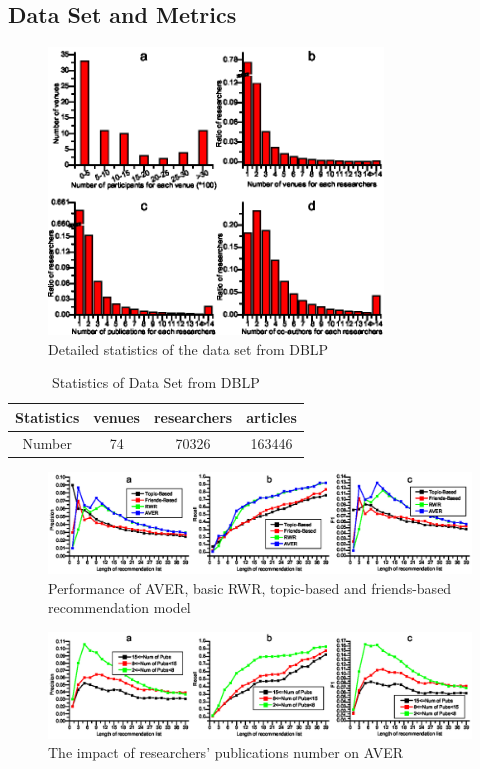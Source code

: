 \documentclass[9pt]{acm_proc_article-sp}
\begin{document}
\subsection{Data Set and Metrics}
\begin{figure}[t]
\centering
\includegraphics [width=3.5in]{Fig3.eps}
\caption{Detailed statistics of the data set from DBLP}
\label{fig3}
\end{figure}
\begin{table}
\renewcommand{\arraystretch}{1.2}
\centering
\caption{Statistics of Data Set from DBLP}
\label{table1}
\begin{tabular}{|c|c|c|c|} \hline
Statistics &venues&researchers&articles\\ \hline
Number & 74 & 70326 &163446 \\
\hline\end{tabular}
\end{table}
\begin{figure}[hbt]
\centering
\includegraphics [width=\textwidth]{Fig4.eps}
\caption{Performance of AVER, basic RWR, topic-based and friends-based recommendation model}
\label{fig4}
\end{figure}
\begin{figure}[hbt]
\centering
\includegraphics [width=\textwidth]{Fig5.eps}
\caption{The impact of researchers' publications number on AVER}
\label{fig5}
\end{figure}
\end{document}
